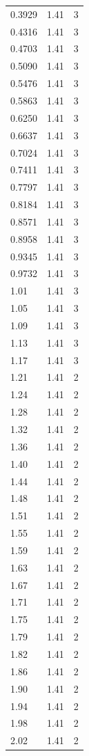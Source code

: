 \begin{longtable}{lrr}
  0.3929 & 1.41 & 3 \\
  0.4316 & 1.41 & 3 \\
  0.4703 & 1.41 & 3 \\
  0.5090 & 1.41 & 3 \\
  0.5476 & 1.41 & 3 \\
  0.5863 & 1.41 & 3 \\
  0.6250 & 1.41 & 3 \\
  0.6637 & 1.41 & 3 \\
  0.7024 & 1.41 & 3 \\
  0.7411 & 1.41 & 3 \\
  0.7797 & 1.41 & 3 \\
  0.8184 & 1.41 & 3 \\
  0.8571 & 1.41 & 3 \\
  0.8958 & 1.41 & 3 \\
  0.9345 & 1.41 & 3 \\
  0.9732 & 1.41 & 3 \\
  1.01 & 1.41 & 3 \\
  1.05 & 1.41 & 3 \\
  1.09 & 1.41 & 3 \\
  1.13 & 1.41 & 3 \\
  1.17 & 1.41 & 3 \\
  1.21 & 1.41 & 2 \\
  1.24 & 1.41 & 2 \\
  1.28 & 1.41 & 2 \\
  1.32 & 1.41 & 2 \\
  1.36 & 1.41 & 2 \\
  1.40 & 1.41 & 2 \\
  1.44 & 1.41 & 2 \\
  1.48 & 1.41 & 2 \\
  1.51 & 1.41 & 2 \\
  1.55 & 1.41 & 2 \\
  1.59 & 1.41 & 2 \\
  1.63 & 1.41 & 2 \\
  1.67 & 1.41 & 2 \\
  1.71 & 1.41 & 2 \\
  1.75 & 1.41 & 2 \\
  1.79 & 1.41 & 2 \\
  1.82 & 1.41 & 2 \\
  1.86 & 1.41 & 2 \\
  1.90 & 1.41 & 2 \\
  1.94 & 1.41 & 2 \\
  1.98 & 1.41 & 2 \\
  2.02 & 1.41 & 2 \\

\end{longtable}
